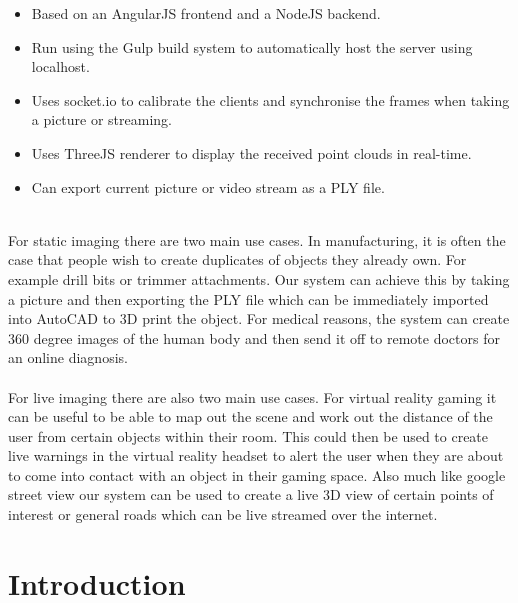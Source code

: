 \documentclass{article}
\begin{document}
\begin{itemize}
\item Based on an AngularJS frontend and a NodeJS backend.
\item Run using the Gulp build system to automatically host the server using localhost.
\item Uses socket.io to calibrate the clients and synchronise the frames when taking a picture or streaming.
\item Uses ThreeJS renderer to display the received point clouds in real-time.
\item Can export current picture or video stream as a PLY file.
\end{itemize}
~\\
For static imaging there are two main use cases. In manufacturing, it is often the case that people wish to create duplicates of objects they already own. For example drill bits or trimmer attachments. Our system can achieve this by taking a picture and then exporting the PLY file which can be immediately imported into AutoCAD to 3D print the object. For medical reasons, the system can create 360 degree images of the human body and then send it off to remote doctors for an online diagnosis.
\\\\
For live imaging there are also two main use cases. For virtual reality gaming it can be useful to be able to map out the scene and work out the distance of the user from certain objects within their room. This could then be used to create live warnings in the virtual reality headset to alert the user when they are about to come into contact with an object in their gaming space. Also much like google street view our system can be used to create a live 3D view of certain points of interest or general roads which can be live streamed over the internet.

\newpage
\section{Introduction}
\end{document}
